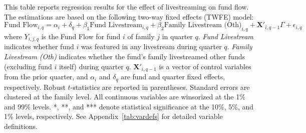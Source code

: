 \begin{table}[!ht]
    \centering

    \caption{Dynamic Livestream Effect on Fund Flow (TWFE)}\label{tab:fund_twfe}

    \begin{minipage}{0.95\textwidth}
        \footnotesize
        This table reports regression results for the effect of livestreaming on fund flow. The estimations are based on the following two-way fixed effects (TWFE) model:
        \begin{equation*}
            \text{Fund Flow}_{i,q} = \alpha_i + \delta_q + \beta_1  \text{Fund Livestream}_{i,q} + \beta_2 \text{Family Livestream (Oth)}_{i,q} + \mathbf{X}'_{i,q-1} \Gamma + \epsilon_{i,q}
        \end{equation*}
        where $Y_{i,j,q}$ is the Fund Flow for fund $i$ of family $j$ in quarter $q$. \textit{Fund Livestream} indicates whether fund $i$ was featured in any livestream during quarter $q$. \textit{Family Livestream (Oth)} indicates whether the fund's family livestreamed other funds (excluding fund $i$ itself) during quarter $q$. $\mathbf{X}'_{i,q-1}$ is a vector of control variables from the prior quarter, and $\alpha_i$ and $\delta_q$ are fund and quarter fixed effects, respectively. Robust $t$-statistics are reported in parentheses. Standard errors are clustered at the family level. All continuous variables are winsorized at the 1\% and 99\% levels. *, **, and *** denote statistical significance at the 10\%, 5\%, and 1\% levels, respectively. See Appendix~\ref{tab:vardefs} for detailed variable definitions.
    \end{minipage}

    \vspace{2mm}

    {
        \footnotesize
        
    }

\end{table}